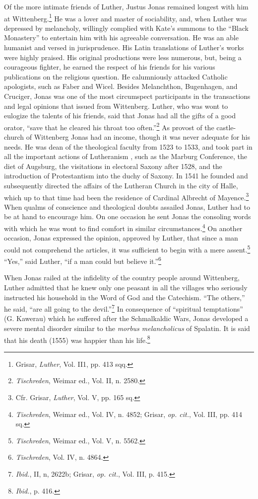 Of the more intimate friends of Luther, Justus Jonas remained longest with him
at Wittenberg.\footnote{Grisar, \textit{Luther}, Vol. II1, pp. 413 sqq.} He was
a lover and master of sociability, and, when Luther was depressed by
melancholy, willingly complied with Kate’s summons to the “Black Monastery” to
entertain him with his agreeable conversation. He was an able humanist and
versed in jurisprudence. His Latin translations of Luther’s works were highly
praised. His original productions were less numerous, but, being a courageous
fighter, he earned the respect of his friends for his various publications on
the religious question. He calumniously attacked Catholic apologists, such as
Faber and Wicel. Besides Melanchthon, Bugenhagen, and Cruciger, Jonas was one
of the most circumspect participants in the transactions and legal opinions
that issued from Wittenberg. Luther, who was wont to eulogize the talents of
his friends, said that Jonas had all the gifts of a good orator, “save that he
cleared his throat too often.”\footnote{\textit{Tischreden}, Weimar ed., Vol.
II, n. 2580.} As provost of the castle-church of Wittenberg Jonas had an
income, though it was never adequate for his needs. He was dean of the
theological faculty from 1523 to 1533, and took part in all the important
actions of Lutheranism , such as the Marburg Conference, the diet of Augsburg,
the visitations in electoral Saxony after 1528, and the introduction of
Protestantism into the duchy of Saxony. In 1541 he founded and subsequently
directed the affairs of the Lutheran Church in the city of Halle, which up to
that time had been the residence of Cardinal Albrecht of Mayence.\footnote{Cfr.
Grisar, \textit{Luther}, Vol. V, pp. 165 sq.} When qualms of conscience and
theological doubts assailed Jonas, Luther had to be at hand to encourage him.
On one occasion he sent Jonas the consoling words with which he was wont to
find comfort in similar circumstances.\footnote{\textit{Tischreden}, Weimar
ed., Vol. IV, n. 4852; Grisar, \textit{op. cit.}, Vol. III, pp. 414 sq.} On
another occasion, Jonas expressed the opinion, approved by Luther, that since a
man could not comprehend the articles, it was sufficient to begin with a mere
assent.\footnote{\textit{Tischreden}, Weimar ed., Vol. V, n. 5562.} “Yes,” said
Luther, “if a man could but believe it.”\footnote{\textit{Tischreden}, Vol. IV,
n. 4864.}

When Jonas railed at the infidelity of the country people around
Wittenberg, Luther admitted that he knew only one peasant in all
the villages who seriously instructed his household in the Word of
God and the Catechism. “The others,” he said, “are all going to the
devil.”\footnote{\textit{Ibid.}, II, n, 2622b; Grisar, \textit{op. cit.}, Vol. III, p. 415.}
 In consequence of “spiritual temptations” (G. Kawerau)
which he suffered after the Schmalkaldic Wars, Jonas developed a
severe mental disorder similar to the \textit{morbus melancholicus} of
Spalatin. It is said that his death (1555) was happier than his life.\footnote{\textit{Ibid.}, p. 416.}

